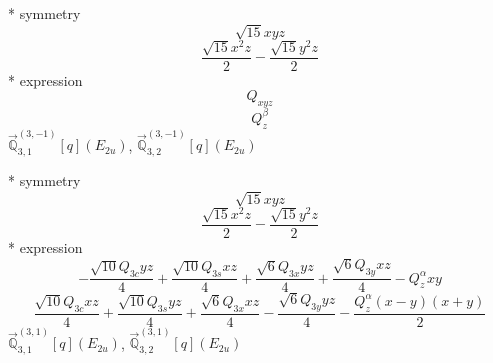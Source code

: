 \documentclass[fleqn,8pt]{jsarticle}
\begin{document}
\noindent\quad ** symmetry
\begin{dmath*}
\sqrt{15} x y z
\end{dmath*}
\begin{dmath*}
\frac{\sqrt{15} x^{2} z}{2} - \frac{\sqrt{15} y^{2} z}{2}
\end{dmath*}
\noindent\quad ** expression
\begin{dmath*}
Q_{xyz}
\end{dmath*}
\begin{dmath*}
Q_{z}^{\beta}
\end{dmath*}
\noindent\quad $\vec{\mathbb{Q}}_{3,1}^{(3,-1)}[q](E_{2u})$, $\vec{\mathbb{Q}}_{3,2}^{(3,-1)}[q](E_{2u})$

\noindent\quad ** symmetry
\begin{dmath*}
\sqrt{15} x y z
\end{dmath*}
\begin{dmath*}
\frac{\sqrt{15} x^{2} z}{2} - \frac{\sqrt{15} y^{2} z}{2}
\end{dmath*}
\noindent\quad ** expression
\begin{dmath*}
- \frac{\sqrt{10} Q_{3c} y z}{4} + \frac{\sqrt{10} Q_{3s} x z}{4} + \frac{\sqrt{6} Q_{3x} y z}{4} + \frac{\sqrt{6} Q_{3y} x z}{4} - Q_{z}^{\alpha} x y
\end{dmath*}
\begin{dmath*}
\frac{\sqrt{10} Q_{3c} x z}{4} + \frac{\sqrt{10} Q_{3s} y z}{4} + \frac{\sqrt{6} Q_{3x} x z}{4} - \frac{\sqrt{6} Q_{3y} y z}{4} - \frac{Q_{z}^{\alpha} \left(x - y\right) \left(x + y\right)}{2}
\end{dmath*}
\noindent\quad $\vec{\mathbb{Q}}_{3,1}^{(3,1)}[q](E_{2u})$, $\vec{\mathbb{Q}}_{3,2}^{(3,1)}[q](E_{2u})$
\end{document}
